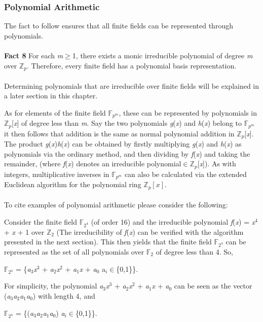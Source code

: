 \documentclass[iwp,first]{luthesis}
\begin{document}
\subsubsection{Polynomial Arithmetic}

The fact to follow ensures that all finite fields can be represented through polynomials.
\\
\\
\textbf{Fact 8} For each \textit{m}$\geq$1, there exists a monic irreducible polynomial of degree \textit{m} over $\mathbb{Z}_p$. Therefore, every finite field has a polynomial basis representation. 
\\
\\
Determining polynomials that are irreducible over finite fields will be explained in a later section in this chapter. 

As for elements of the finite field $\mathbb{F}_{p^m}$, these can be represented by polynomials in $\mathbb{Z}_{p}$[\textit{x}] of degree less than \textit{m}. Say the two polynomials \textit{g}(\textit{x}) and \textit{h}(\textit{x}) belong to $\mathbb{F}_{p^m}$ it then follows that addition is the same as normal polynomial addition in $\mathbb{Z}_p$[\textit{x}]. The product \textit{g}(\textit{x})\textit{h}(\textit{x}) can be obtained by firstly multiplying \textit{g}(\textit{x}) and \textit{h}(\textit{x}) as polynomials via the ordinary method, and then dividing by \textit{f}(\textit{x}) and taking the remainder, (where \textit{f}(\textit{x}) denotes an irreducible polynomial$\in\mathbb{Z}_p$[\textit{x}]). As with integers, multiplicative inverses in $\mathbb{F}_{p^m}$ can also be calculated via the extended Euclidean algorithm for the polynomial ring $\mathbb{Z}_p[\textit{x}]$. 
\\
\\
To cite examples of polynomial arithmetic please consider the following: 

\begin{example}
Consider the finite field $\mathbb{F}_{2^4}$ (of order 16) and the irreducible polynomial \textit{f}(\textit{x}) = \textit{x}$^4$ + \textit{x} + 1 over $\mathbb{Z}_2$ (The irreducibility of \textit{f}(\textit{x}) can be verified with the algorithm presented in the next section). This then yields that the finite field $\mathbb{F}_{2^4}$ can be represented as the set of all polynomials over $\mathbb{F}_2$ of degree less than 4. So, 

\begin{center}
$\mathbb{F}_{2^4}$ = \{\textit{a}$_3$\textit{x}$^3$ + \textit{a}$_2$\textit{x}$^2$ + \textit{a}$_1$\textit{x} + \textit{a}$_0$ \textbar a$_i\in$\{0,1\}\}.
\end{center}

For simplicity, the polynomial \textit{a}$_3$\textit{x}$^3$ + \textit{a}$_2$\textit{x}$^2$ + \textit{a}$_1$\textit{x} + \textit{a}$_0$ can be seen as the vector (\textit{a}$_3$\textit{a}$_2$\textit{a}$_1$\textit{a}$_0$) with length 4, and

\begin{center}
$\mathbb{F}_{2^4}$ = \{(\textit{a}$_3$\textit{a}$_2$\textit{a}$_1$\textit{a}$_0$) \textbar   \textit{a}$_i\in$\{0,1\}\}.
\end{center}
\end{example}
\end{document}
